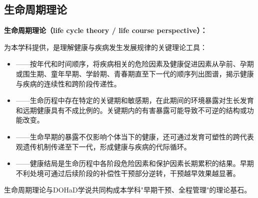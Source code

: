 \subsection{生命周期理论}

\begin{keybox}
\textbf{生命周期理论（life cycle theory / life course perspective）：}

为本学科提供，是理解健康与疾病发生发展规律的关键理论工具：

\begin{itemize}[leftmargin=*]
    \item {}——按年代和时间顺序，将疾病相关的危险因素及健康促进因素从孕前、孕期或围生期、童年早期、学龄期、青春期直至下一代的顺序列出图谱，揭示健康与疾病的连续性和跨阶段传递性。
    \item {}——生命历程中存在特定的关键期和敏感期，在此期间的环境暴露对生长发育和远期健康具有不成比例的。关键期内的有害暴露可能导致不可逆的结构或功能改变。
    \item {}——生命早期的暴露不仅影响个体当下的健康，还可通过发育可塑性的跨代表观遗传机制传递至下一代，形成健康与疾病的代际循环。
    \item {}——健康结局是生命历程中各阶段危险因素和保护因素长期累积的结果。早期不利处境可通过后续阶段的补偿性干预部分逆转，干预越早效果越显著。
\end{itemize}

生命周期理论与DOHaD学说共同构成本学科"早期干预、全程管理"的理论基石。
\end{keybox}

\newpage
